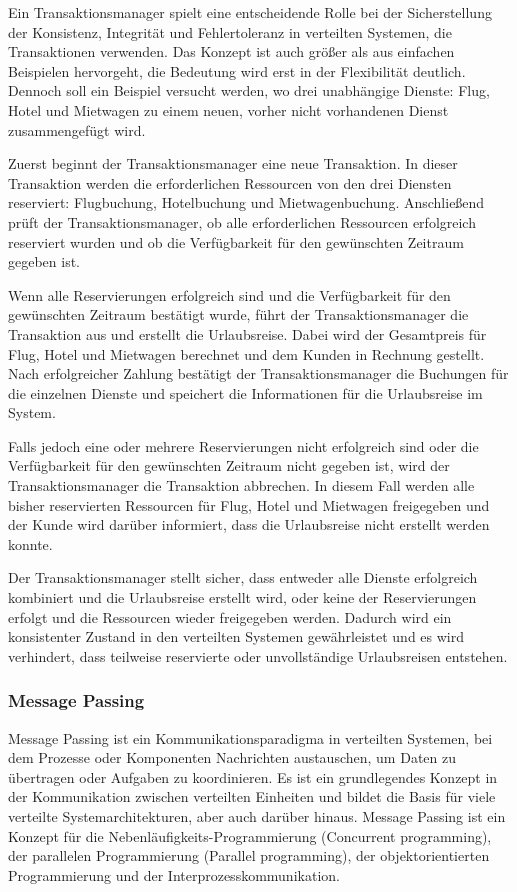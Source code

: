 Ein Transaktionsmanager spielt eine entscheidende Rolle bei der Sicherstellung der Konsistenz, Integrität und Fehlertoleranz in verteilten Systemen, die Transaktionen verwenden. Das Konzept ist auch größer als aus einfachen Beispielen hervorgeht, die Bedeutung wird erst in der Flexibilität  deutlich. Dennoch soll ein Beispiel versucht werden, wo drei unabhängige Dienste: Flug, Hotel und Mietwagen zu einem neuen, vorher nicht vorhandenen Dienst zusammengefügt wird. 

Zuerst beginnt der Transaktionsmanager eine neue Transaktion. In dieser Transaktion werden die erforderlichen Ressourcen von den drei Diensten reserviert: Flugbuchung, Hotelbuchung und Mietwagenbuchung. Anschließend prüft der Transaktionsmanager, ob alle erforderlichen Ressourcen erfolgreich reserviert wurden und ob die Verfügbarkeit für den gewünschten Zeitraum gegeben ist.

Wenn alle Reservierungen erfolgreich sind und die Verfügbarkeit für den gewünschten Zeitraum bestätigt wurde, führt der Transaktionsmanager die Transaktion aus und erstellt die Urlaubsreise. Dabei wird der Gesamtpreis für Flug, Hotel und Mietwagen berechnet und dem Kunden in Rechnung gestellt. Nach erfolgreicher Zahlung bestätigt der Transaktionsmanager die Buchungen für die einzelnen Dienste und speichert die Informationen für die Urlaubsreise im System.

Falls jedoch eine oder mehrere Reservierungen nicht erfolgreich sind oder die Verfügbarkeit für den gewünschten Zeitraum nicht gegeben ist, wird der Transaktionsmanager die Transaktion abbrechen. In diesem Fall werden alle bisher reservierten Ressourcen für Flug, Hotel und Mietwagen freigegeben und der Kunde wird darüber informiert, dass die Urlaubsreise nicht erstellt werden konnte.

Der Transaktionsmanager stellt sicher, dass entweder alle Dienste erfolgreich kombiniert und die Urlaubsreise erstellt wird, oder keine der Reservierungen erfolgt und die Ressourcen wieder freigegeben werden. Dadurch wird ein konsistenter Zustand in den verteilten Systemen gewährleistet und es wird verhindert, dass teilweise reservierte oder unvollständige Urlaubsreisen entstehen.
\subsubsection{Message Passing}
Message Passing ist ein Kommunikationsparadigma in verteilten Systemen, bei dem Prozesse oder Komponenten Nachrichten austauschen, um Daten zu übertragen oder Aufgaben zu koordinieren. Es ist ein grundlegendes Konzept in der Kommunikation zwischen verteilten Einheiten und bildet die Basis für viele verteilte Systemarchitekturen, aber auch darüber hinaus.
Message Passing ist ein Konzept für die Nebenläufigkeits-Programmierung (Concurrent programming), der parallelen Programmierung (Parallel programming), der objektorientierten Programmierung und der Interprozesskommunikation.

